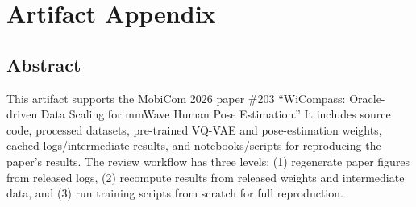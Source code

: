 \documentclass{sigplanconf}
\begin{document}
\appendix
\section{Artifact Appendix}

\subsection{Abstract}
This artifact supports the MobiCom 2026 paper \#203 ``WiCompass: Oracle-driven Data Scaling for mmWave Human Pose Estimation.''  It includes source code, processed datasets, pre-trained VQ-VAE and pose-estimation weights, cached logs/intermediate results, and notebooks/scripts for reproducing the paper's results.  The review workflow has three levels: (1) regenerate paper figures from released logs, (2) recompute results from released weights and intermediate data, and (3) run training scripts from scratch for full reproduction.
\end{document}
